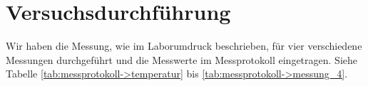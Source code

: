 \section{Versuchsdurchführung}
\label{sec:durchfuehrung}
Wir haben die Messung, wie im Laborumdruck beschrieben, für vier verschiedene Messungen durchgeführt und die Messwerte im Messprotokoll eingetragen. Siehe Tabelle \ref{tab:messprotokoll->temperatur} bis \ref{tab:messprotokoll->messung_4}.